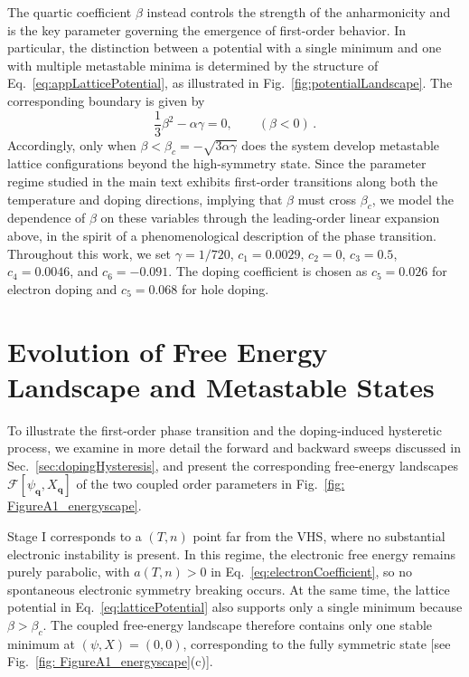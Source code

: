 \documentclass[aps,prx,article,twocolumn,amsmath,amssymb,superscriptaddress,longbibliography]{revtex4-2}
\begin{document}
The quartic coefficient $\beta$ instead controls the strength of the anharmonicity and is the key parameter governing the emergence of first-order behavior. In particular, the distinction between a potential with a single minimum and one with multiple metastable minima is determined by the structure of Eq.~\eqref{eq:appLatticePotential}, as illustrated in Fig.~\ref{fig:potentialLandscape}. The corresponding boundary is given by
\begin{equation}
\frac{1}{3}\beta^2-\alpha\gamma=0,
\qquad (\beta<0)\,.
\end{equation}
Accordingly, only when $\beta < \beta_c =-\sqrt{3\alpha \gamma}$ does the system develop metastable lattice configurations beyond the high-symmetry state. Since the parameter regime studied in the main text exhibits first-order transitions along both the temperature and doping directions, implying that $\beta$ must cross $\beta_c$, we model the dependence of $\beta$ on these variables through the leading-order linear expansion above, in the spirit of a phenomenological description of the phase transition. Throughout this work, we set $\gamma=1/720$, $c_1=0.0029$, $c_2=0$, $c_3=0.5$, $c_4=0.0046$, and $c_6=-0.091$. The doping coefficient is chosen as $c_5=0.026$ for electron doping and $c_5=0.068$ for hole doping.








\section{Evolution of Free Energy Landscape and Metastable States}\label{app:FreeEnergyEvolution}

To illustrate the first-order phase transition and the doping-induced hysteretic process, we examine in more detail the forward and backward sweeps discussed in Sec.~\ref{sec:dopingHysteresis}, and present the corresponding free-energy landscapes $\mathcal F[\psi_{\mathbf q},X_{\mathbf q}]$ of the two coupled order parameters in Fig.~\ref{fig: FigureA1_energyscape}.

Stage I corresponds to a $(T,n)$ point far from the VHS, where no substantial electronic instability is present. In this regime, the electronic free energy remains purely parabolic, with $a(T,n) > 0$ in Eq.~\eqref{eq:electronCoefficient}, so no spontaneous electronic symmetry breaking occurs. At the same time, the lattice potential in Eq.~\eqref{eq:latticePotential} also supports only a single minimum because $\beta > \beta_c$. The coupled free-energy landscape therefore contains only one stable minimum at $(\psi,X)=(0,0)$, corresponding to the fully symmetric state [see Fig.~\ref{fig: FigureA1_energyscape}(c)].
\end{document}
